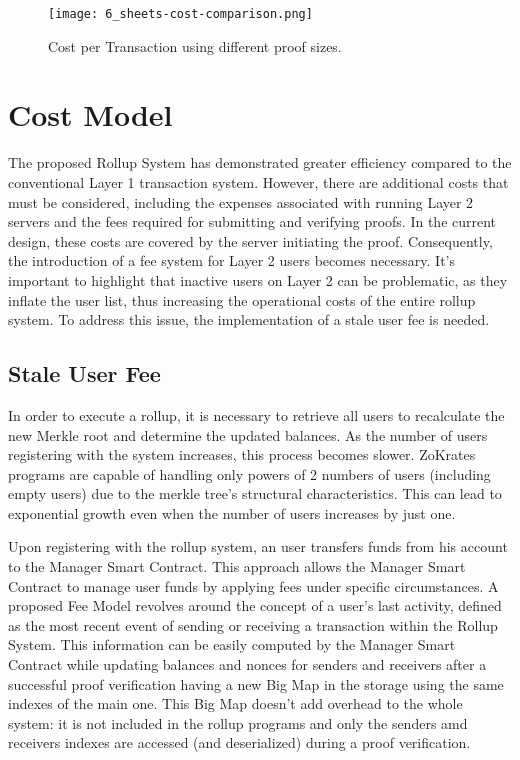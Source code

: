\begin{figure}[ht]
	\centering
	\texttt{[image: 6\_sheets-cost-comparison.png]}
	\caption[Cost Comparison]{Cost per Transaction using different proof sizes.}  
	\label{fig:6_sheets-cost-comparison.png}
  \end{figure} 

  \section{Cost Model}

The proposed Rollup System has demonstrated greater efficiency compared to the conventional Layer 1 transaction system. However, there are additional costs that must be considered, including the expenses associated with running Layer 2 servers and the fees required for submitting and verifying proofs. In the current design, these costs are covered by the server initiating the proof. Consequently, the introduction of a fee system for Layer 2 users becomes necessary. It's important to highlight that inactive users on Layer 2 can be problematic, as they inflate the user list, thus increasing the operational costs of the entire rollup system. To address this issue, the implementation of a stale user fee is needed.

\subsection{Stale User Fee}

In order to execute a rollup, it is necessary to retrieve all users to recalculate the new Merkle root and determine the updated balances. As the number of users registering with the system increases, this process becomes slower. ZoKrates programs are capable of handling only powers of 2 numbers of users (including empty users) due to the merkle tree's structural characteristics. This can lead to exponential growth even when the number of users increases by just one.

Upon registering with the rollup system, an user transfers funds from his account to the Manager Smart Contract. This approach allows the Manager Smart Contract to manage user funds by applying fees under specific circumstances. A proposed Fee Model revolves around the concept of a user's last activity, defined as the most recent event of sending or receiving a transaction within the Rollup System. This information can be easily computed by the Manager Smart Contract while updating balances and nonces for senders and receivers after a successful proof verification having a new Big Map in the storage using the same indexes of the main one. This Big Map doesn't add overhead to the whole system: it is not included in the rollup programs and only the senders amd receivers indexes are accessed (and deserialized) during a proof verification.

